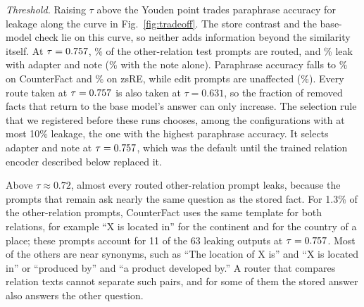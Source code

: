 \documentclass[journal,10pt]{IEEEtran}
\begin{document}
\emph{Threshold.} Raising $\tau$ above the Youden point trades paraphrase accuracy for
leakage along the curve in Fig.~\ref{fig:tradeoff}. The store contrast and the base-model
check lie on this curve, so neither adds information beyond the similarity itself. At
$\tau=0.757$, \sCfEthreeRoutedPct\% of the other-relation test prompts are routed, and
\sCfEthreeLeakBothPct\% leak with adapter and note (\sCfEthreeLeakNotePct\% with the note
alone). Paraphrase accuracy falls to \sCfParaBothPct\% on CounterFact and
\sZsParaBothPct\% on zsRE, while edit prompts are unaffected (\sCfEffBothPct\%). Every
route taken at $\tau=0.757$ is also taken at $\tau=0.631$, so the fraction of removed
facts that return to the base model's answer can only increase. The selection rule that
we registered before these runs chooses, among the configurations with at most 10\%
leakage, the one with the highest paraphrase accuracy. It selects adapter and note at
$\tau=0.757$, which was the default until the trained relation encoder described below
replaced it.

Above $\tau\approx0.72$, almost every routed other-relation prompt leaks, because the
prompts that remain ask nearly the same question as the stored fact. For 1.3\% of the
other-relation prompts, CounterFact uses the same template for both relations, for
example ``X is located in'' for the continent and for the country of a place; these
prompts account for 11 of the 63 leaking outputs at $\tau=0.757$. Most of the others
are near synonyms, such as ``The location of X is'' and ``X is located in'' or
``produced by'' and ``a product developed by.'' A router that compares relation texts
cannot separate such pairs, and for some of them the stored answer also answers the other
question.
\end{document}
